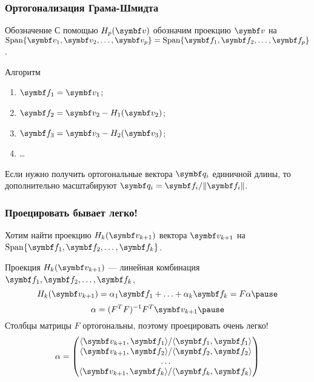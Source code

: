 \begin{frame}
    \frametitle{Ортогонализация Грама-Шмидта}
    
    \begin{block}{Обозначение}
        С помощью $H_p(\bv)$ обозначим проекцию $\bv$ на $\Span \{ \bv_1, \bv_2, \ldots, \bv_p \} = \Span \{ \bff_1, \bff_2, \ldots, \bff_p \}$. \pause
    \end{block}

    \begin{block}{Алгоритм}
        \begin{enumerate}
            \item $\bff_1 = \bv_1$; \pause
            \item $\bff_2 = \bv_2 - H_1(\bv_2)$; \pause
            \item $\bff_3 = \bv_3 - H_2(\bv_3)$; \pause
            \item \ldots
        \end{enumerate}        \pause
    \end{block}

    Если нужно получить ортогональные вектора $\bq_i$ единичной длины, то дополнительно масштабируют
    $\bq_i = \bff_i / \norm{\bff_i}$.
    
\end{frame}


\begin{frame}
    \frametitle{Проецировать бывает легко!}
    Хотим найти проекцию $H_k(\bv_{k+1})$ вектора  $\bv_{k+1}$ на $\Span\{ \bff_1, \bff_2, \ldots, \bff_k \}$. 

    Проекция $H_k(\bv_{k+1})$ — линейная комбинация $\bff_1, \bff_2, \ldots, \bff_k$,
    \[
        H_k(\bv_{k+1}) = \alpha_1 \bff_1 + \ldots + \alpha_k \bff_k = F \alpha    \pause
    \]
    \[
    \alpha = (F^TF)^{-1} F^T \bv_{k+1} \pause    
    \]
    Столбцы матрицы $F$ ортогональны, поэтому проецировать очень легко!
    \[
    \alpha = \begin{pmatrix}
        \langle \bv_{k+1}, \bff_1 \rangle / \langle \bff_1, \bff_1 \rangle \\
        \langle \bv_{k+1}, \bff_2 \rangle / \langle \bff_2, \bff_2 \rangle \\
        \ldots \\
\langle \bv_{k+1}, \bff_k \rangle / \langle \bff_k, \bff_k \rangle \\
    \end{pmatrix}    
    \]

\end{frame}


